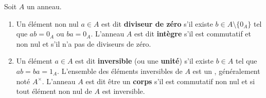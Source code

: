 \documentclass[]{report}
\begin{document}
\begin{df}{}{}
    Soit $A$ un anneau.
    \begin{enumerate}
        \item Un élément non nul $a \in A$ est dit \textbf{diviseur de zéro} s'il existe $b \in A \setminus \{0_A\}$ tel que $ab = 0_A$ ou $ba = 0_A$. L'anneau $A$ est dit \textbf{intègre} s'il est commutatif et non nul et s'il n'a pas de diviseurs de zéro.
        \item Un élément $a \in A$ est dit \textbf{inversible} (ou une \textbf{unité}) s'il existe $b \in A$ tel que $ab = ba = 1_A$. L'ensemble des éléments inversibles de $A$ est un \gr, généralement noté $A^\times$. L'anneau $A$ est dit être un \textbf{corps} s'il est commutatif non nul et si tout élément non nul de $A$ est inversible.
    \end{enumerate}
\end{df}
\end{document}
